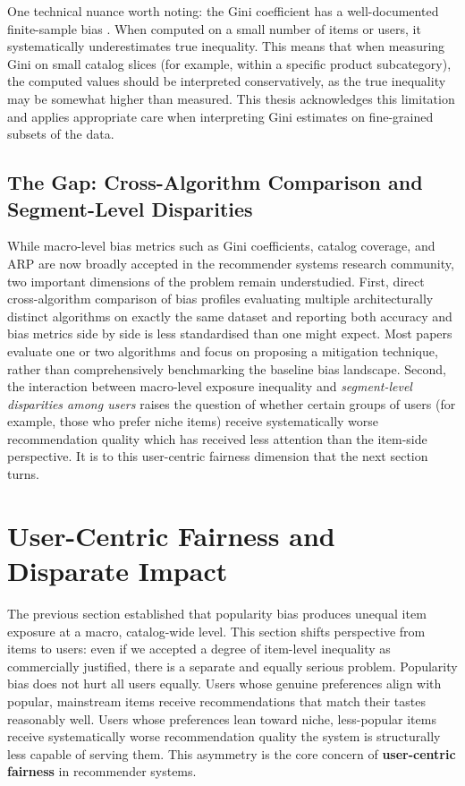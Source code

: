 \documentclass[11pt,a4paper]{report}
\begin{document}
One technical nuance worth noting: the Gini coefficient has a well-documented finite-sample bias \citep{deltas2003gini} . When computed on a small number of items or users, it systematically underestimates true inequality. This means that when measuring Gini on small catalog slices (for example, within a specific product subcategory), the computed values should be interpreted conservatively, as the true inequality may be somewhat higher than measured. This thesis acknowledges this limitation and applies appropriate care when interpreting Gini estimates on fine-grained subsets of the data.

\subsection*{The Gap: Cross-Algorithm Comparison and Segment-Level Disparities}

While macro-level bias metrics such as Gini coefficients, catalog coverage, and ARP are now broadly accepted in the recommender systems research community, two important dimensions of the problem remain understudied. First, direct cross-algorithm comparison of bias profiles evaluating multiple architecturally distinct algorithms on exactly the same dataset and reporting both accuracy and bias metrics side by side is less standardised than one might expect. Most papers evaluate one or two algorithms and focus on proposing a mitigation technique, rather than comprehensively benchmarking the baseline bias landscape. Second, the interaction between macro-level exposure inequality and \emph{segment-level disparities among users} raises the question of whether certain groups of users (for example, those who prefer niche items) receive systematically worse recommendation quality which has received less attention than the item-side perspective. It is to this user-centric fairness dimension that the next section turns.

\section{User-Centric Fairness and Disparate Impact}
\label{sec:lit_fairness}

The previous section established that popularity bias produces unequal item exposure at a macro, catalog-wide level. This section shifts perspective from items to users: even if we accepted a degree of item-level inequality as commercially justified, there is a separate and equally serious problem. Popularity bias does not hurt all users equally. Users whose genuine preferences align with popular, mainstream items receive recommendations that match their tastes reasonably well. Users whose preferences lean toward niche, less-popular items receive systematically worse recommendation quality the system is structurally less capable of serving them. This asymmetry is the core concern of \textbf{user-centric fairness} in recommender systems.
\end{document}
